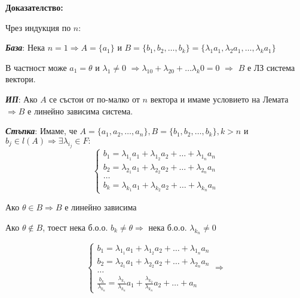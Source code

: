 \documentclass[fleqn,12pt]{article}
\begin{document}
\begin{flushleft}
\vspace{5mm}

\textbf{Доказателство:}

Чрез индукция по $n$:

\vspace{5mm}

\textbf{\textit{База}}: Нека $ n = 1 \Rightarrow A = \{a_1\} $ и $ B = \{b_1, b_2, \dots, b_k \} = \{\lambda_1 a_1, \lambda_2 a_1, \dots, \lambda_k a_1 \} $

В частност може $ a_1 = \theta$ и $\lambda_1 \neq 0$ $ \Rightarrow \lambda_10 + \lambda_20 + \dots \lambda_k0 = 0$ $\Rightarrow$ $B$ е ЛЗ система вектори.

\vspace{5mm}

\textbf{\textit{ИП}}:  Ако $A$ се състои от по-малко от $n$ вектора и имаме условието на Лемата $ \Rightarrow B $ е линейно зависима система.

\textbf{\textit{Стъпка}}: Имаме, че $ A = \{a_1, a_2, \dots, a_n\}, B = \{b_1, b_2, \dots, b_k\}, k > n $ и $ b_j \in l(A) \Rightarrow \exists \lambda_{i_j} \in F:$
\begin{equation}
    \begin{cases}
        b_1 = \lambda_{1_1} a_1 + \lambda_{1_2} a_2 + \dots + \lambda_{1_n} a_n\\
        b_2 = \lambda_{2_1} a_1 + \lambda_{2_2} a_2 + \dots + \lambda_{2_n} a_n\\
        \dots\\
        b_k = \lambda_{k_1} a_1 + \lambda_{k_2} a_2 + \dots + \lambda_{k_n} a_n
    \end{cases}
\end{equation}

Ако $ \theta \in B \Rightarrow B $ е линейно зависима

Ако $ \theta \notin B $, тоест нека б.о.о. $ b_k \neq \theta \Rightarrow $ нека б.о.о. $\lambda_{k_n} \neq 0 $

\begin{equation}
    \begin{cases}
        b_1 = \lambda_{1_1} a_1 + \lambda_{1_2} a_2 + \dots + \lambda_{1_n} a_n\\
        b_2 = \lambda_{2_1} a_1 + \lambda_{2_2} a_2 + \dots + \lambda_{2_n} a_n\\
        \dots\\
        \frac{b_k}{\lambda_{k_n}} = \frac{\lambda_{k_1}}{\lambda_{k_n}} a_1 + \frac{\lambda_{k_2}}{\lambda_{k_n}} a_2 + \dots + a_n
    \end{cases}
    \Rightarrow
\end{equation}


\end{flushleft}
\end{document}
